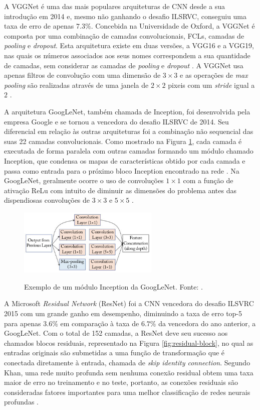 A VGGNet é uma das mais populares arquiteturas de CNN desde a sua introdução em 2014 e, mesmo não ganhando o desafio ILSRVC, conseguiu uma taxa de erro de apenas $7.3 \%$. Concebida na Universidade de Oxford, a VGGNet é composta por uma combinação de camadas convolucionais, FCLs, camadas de \emph{pooling} e \emph{dropout}. Esta arquitetura existe em duas versões, a VGG16 e a VGG19, nas quais os números associados aos seus nomes correspondem a sua quantidade de camadas, sem considerar as camadas de \emph{pooling} e \emph{dropout} \cite{khan, sewak}. A VGGNet usa apenas filtros de convolução com uma dimensão de  $3 \times 3$ e as operações de \emph{max pooling} são realizadas através de uma janela de $2 \times 2$ pixeis com um \emph{stride} igual a $2$ \cite{simonyan}.

A arquitetura GoogLeNet, também chamada de Inception, foi desenvolvida pela empresa Google e se tornou a vencedora do desafio ILSRVC de 2014. Seu diferencial em relação às outras arquiteturas foi a combinação não sequencial das suas 22 camadas convolucionais. Como mostrado na Figura \ref{fig:inception-module}, cada camada é executada de forma paralela com outras camadas formando um módulo chamado Inception, que condensa os mapas de características obtido por cada camada e passa como entrada para o próximo bloco Inception encontrado na rede \cite{khan}. Na GoogLeNet, geralmente ocorre o uso de convoluções $1 \times 1$ com a função de ativação ReLu com intuito de diminuir as dimensões do problema antes das dispendiosas convoluções de $3 \times 3$ e $5 \times 5$ \cite{sewak}.

\begin{figure}[h!]
  \centering
  \caption{Exemplo de um módulo Inception da GoogLeNet. Fonte: \cite{khan}.}
  \includegraphics[width=0.6\textwidth]{imgs/inception-module}
  \label{fig:inception-module}
\end{figure}

A Microsoft \emph{Residual Network} (ResNet) foi a CNN vencedora do desafio ILSVRC 2015 com um grande ganho em desempenho, diminuindo a taxa de erro top-5 para apenas $3.6\%$ em comparação à taxa de $6.7\%$ da vencedora do ano anterior, a GoogLeNet. Com o total de 152 camadas, a ResNet deve seu sucesso aos chamados blocos residuais, representado na Figura \ref{fig:residual-block}, no qual as entradas originais são submetidas a uma função de transformação que é conectada diretamente à entrada, chamada de \emph{skip identity connection}. Segundo Khan, uma rede muito profunda sem nenhuma conexão residual obtem uma taxa maior de erro no treinamento e no teste, portanto, as conexões residuais são consideradas fatores importantes para uma melhor classificação de redes neurais profundas \cite{khan}.

